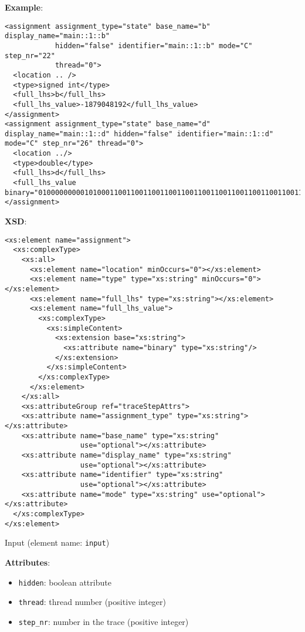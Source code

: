 \documentclass[12pt]{article}
\begin{document}
\noindent\textbf{Example}:
\begin{verbatim}
<assignment assignment_type="state" base_name="b" display_name="main::1::b"
            hidden="false" identifier="main::1::b" mode="C" step_nr="22"
            thread="0">
  <location .. />
  <type>signed int</type>
  <full_lhs>b</full_lhs>
  <full_lhs_value>-1879048192</full_lhs_value>
</assignment>
<assignment assignment_type="state" base_name="d" display_name="main::1::d" hidden="false" identifier="main::1::d" mode="C" step_nr="26" thread="0">
  <location ../>
  <type>double</type>
  <full_lhs>d</full_lhs>
  <full_lhs_value
binary="0100000000010100011001100110011001100110011001100110011001100110">5.1</full_lhs_value>
</assignment>
\end{verbatim}

\noindent\textbf{XSD}:
\begin{verbatim}
<xs:element name="assignment">
  <xs:complexType>
    <xs:all>
      <xs:element name="location" minOccurs="0"></xs:element>
      <xs:element name="type" type="xs:string" minOccurs="0"></xs:element>
      <xs:element name="full_lhs" type="xs:string"></xs:element>
      <xs:element name="full_lhs_value">
        <xs:complexType>
          <xs:simpleContent>
            <xs:extension base="xs:string">
              <xs:attribute name="binary" type="xs:string"/>
            </xs:extension>
          </xs:simpleContent>
        </xs:complexType>
      </xs:element>
    </xs:all>
    <xs:attributeGroup ref="traceStepAttrs">
    <xs:attribute name="assignment_type" type="xs:string"></xs:attribute>
    <xs:attribute name="base_name" type="xs:string"
                  use="optional"></xs:attribute>
    <xs:attribute name="display_name" type="xs:string"
                  use="optional"></xs:attribute>
    <xs:attribute name="identifier" type="xs:string"
                  use="optional"></xs:attribute>
    <xs:attribute name="mode" type="xs:string" use="optional"></xs:attribute>
  </xs:complexType>
</xs:element>
\end{verbatim}


\begin{center}
{\Large Input} (element name: \texttt{input})
\end{center}

\noindent\textbf{Attributes}:
\begin{itemize}
\item \texttt{hidden}: boolean attribute
\item \texttt{thread}: thread number (positive integer)
\item \texttt{step\_nr}: number in the trace (positive integer)
\end{itemize}
\end{document}
